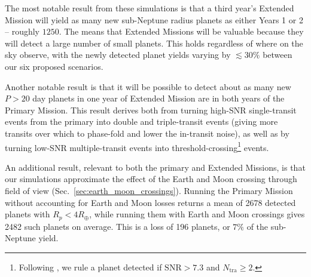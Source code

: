 The most notable result from these simulations is that a third year's Extended Mission will yield as many new sub-Neptune radius planets as either Years 1 or 2 -- roughly $1250$.
The means that Extended Missions will be valuable because they will detect a large number of small planets.
This holds regardless of where on the sky observe, with the newly detected planet yields varying by $\lesssim 30\%$ between our six proposed scenarios.

Another notable result is that it will be possible to detect about as many new $P>20$ day planets in one year of \tesss Extended Mission are in both years of the Primary Mission.
This result derives both from turning high-SNR single-transit events from the primary into double and triple-transit events (giving more transits over which to phase-fold and lower the in-transit noise), as well as by turning low-SNR multiple-transit events into threshold-crossing\footnote{Following \citet{Sullivan_2015}, we rule a planet detected if $\mathrm{SNR} > 7.3$ and $N_\mathrm{tra}\geq 2$.} events.

An additional result, relevant to both the primary and Extended Missions, is that our simulations approximate the effect of the Earth and Moon crossing through \tesss field of view (Sec.~\ref{sec:earth_moon_crossings}).
Running the Primary Mission without accounting for Earth and Moon losses returns a mean of 2678 detected planets with $R_p<4R_\oplus$, while running them with Earth and Moon crossings gives 2482 such planets on average.
This is a loss of 196 planets, or $7\%$ of the sub-Neptune yield.



